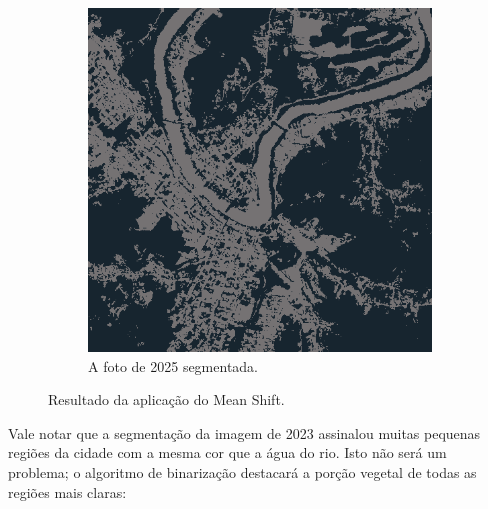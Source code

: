 \documentclass{article}
\begin{document}
\begin{figure}[H]
\begin{subfigure}[b]{0.48\textwidth}
        \includegraphics[width=\textwidth]{../Imagens/012025_mean_shift.png}
        \caption{A foto de 2025 segmentada.}
        \label{2025}
    \end{subfigure}
    \caption{Resultado da aplicação do Mean Shift.}
    \label{segmentada}
\end{figure}

Vale notar que a segmentação da imagem de 2023 assinalou muitas pequenas regiões da cidade com a mesma cor que a água do rio. Isto não será um problema; o algoritmo de binarização destacará a porção vegetal de todas as regiões mais claras:
\end{document}
